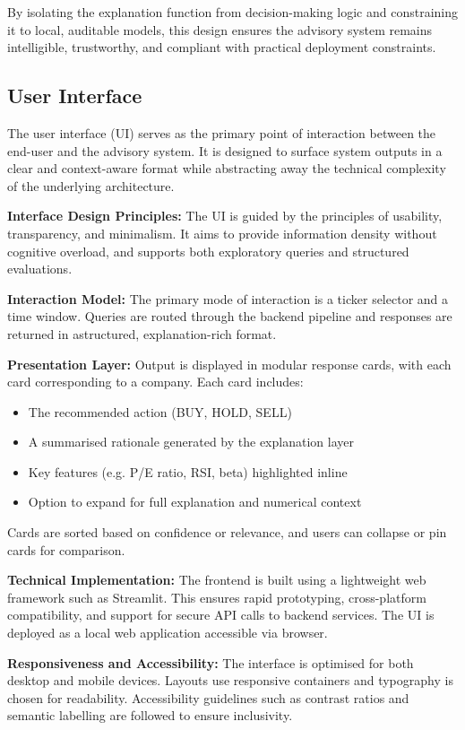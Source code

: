 By isolating the explanation function from decision-making logic and constraining it to local, auditable models, this design ensures the advisory system remains intelligible, trustworthy, and compliant with practical deployment constraints.

\subsection{User Interface}

The user interface (UI) serves as the primary point of interaction between the end-user and the advisory system. It is designed to surface system outputs in a clear and context-aware format while abstracting away the technical complexity of the underlying architecture.

\textbf{Interface Design Principles:} The UI is guided by the principles of usability, transparency, and minimalism. It aims to provide information density without cognitive overload, and supports both exploratory queries and structured evaluations.

\textbf{Interaction Model:} The primary mode of interaction is a ticker selector and a time window. Queries are routed through the backend pipeline and responses are returned in astructured, explanation-rich format.

\textbf{Presentation Layer:} Output is displayed in modular response cards, with each card corresponding to a company. Each card includes:
\begin{itemize}
    \item The recommended action (BUY, HOLD, SELL)
    \item A summarised rationale generated by the explanation layer
    \item Key features (e.g. P/E ratio, RSI, beta) highlighted inline
    \item Option to expand for full explanation and numerical context
\end{itemize}
Cards are sorted based on confidence or relevance, and users can collapse or pin cards for comparison.

\textbf{Technical Implementation:} The frontend is built using a lightweight web framework such as Streamlit. This ensures rapid prototyping, cross-platform compatibility, and support for secure API calls to backend services. The UI is deployed as a local web application accessible via browser.

\textbf{Responsiveness and Accessibility:} The interface is optimised for both desktop and mobile devices. Layouts use responsive containers and typography is chosen for readability. Accessibility guidelines such as contrast ratios and semantic labelling are followed to ensure inclusivity.

